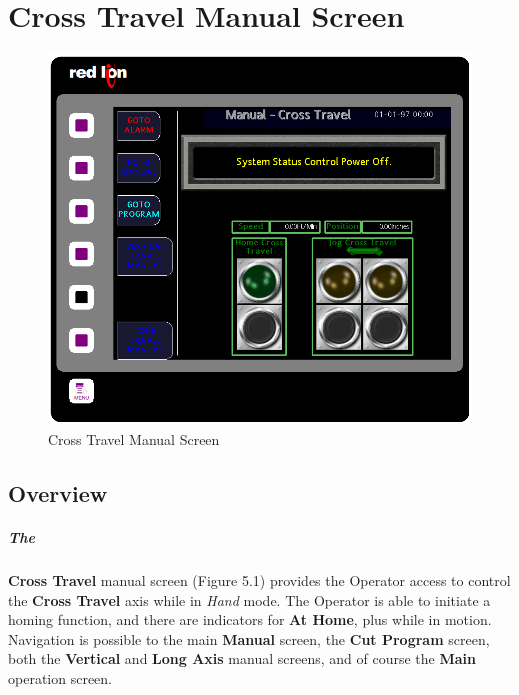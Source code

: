\chapter{Cross Travel Manual Screen}
\begin{figure}
	\centering
	\includegraphics[width=0.5\linewidth]{screen-captures/manual/trans-manual}
	\caption{Cross Travel Manual Screen}
	\label{fig:manual-cross-screen}
\end{figure}
\section{Overview}\paragraph*{The}\textbf{Cross Travel} manual screen (Figure 5.1) provides the Operator access to control the \textbf{Cross Travel} axis while in \textit{Hand} mode. The Operator is able to initiate a homing function, and there are indicators for \textbf{At Home}, plus while in motion. Navigation is possible to the main \textbf{Manual} screen, the \textbf{Cut Program} screen, both the \textbf{Vertical} and \textbf{Long Axis} manual screens, and of course the \textbf{Main} operation screen.
